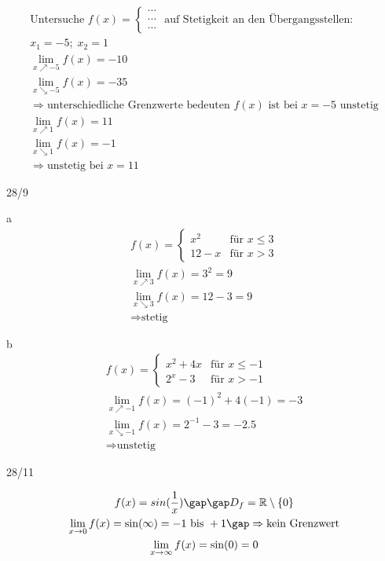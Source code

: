 \begin{gather*}
\text{Untersuche $f(x) = \begin{cases} \cdots \\ \cdots \\ \cdots \end{cases}$ auf Stetigkeit an den Übergangsstellen:} \\
  x_1 = -5;\; x_2 = 1 \\
  \lim\limits_{x \nearrow -5} f(x) = -10 \\
  \lim\limits_{x \searrow -5} f(x) = -35 \\
  \Rightarrow \text{unterschiedliche Grenzwerte bedeuten $f(x)$ ist bei $x = -5$ unstetig} \\
  \lim\limits_{x \nearrow 1} f(x) = 11 \\
  \lim\limits_{x \searrow 1} f(x) = -1 \\
  \Rightarrow \text{unstetig bei $x = 11$}
\end{gather*}
\begin{exercise}{28/9}
  \item [a]
  \begin{gather*}
    f(x) = \begin{cases}
      x^2 & \text{für } x \leq 3 \\
      12 - x & \text{für } x > 3
    \end{cases} \\
    \lim\limits_{x \nearrow 3} f(x) = 3^2 = 9 \\
    \lim\limits_{x \searrow 3} f(x) = 12 - 3 = 9 \\
    \Rightarrow \text{stetig}
  \end{gather*}
  \item [b]
  \begin{gather*}
    f(x) = \begin{cases}
      x^2 + 4x & \text{für } x \leq -1 \\
      2^x - 3 & \text{für } x > -1
    \end{cases} \\
    \lim\limits_{x \nearrow -1} f(x) = (-1)^2 + 4(-1) = -3 \\
    \lim\limits_{x \searrow -1} f(x) = 2^{-1} - 3 = -2.5 \\
    \Rightarrow \text{unstetig}
  \end{gather*}
\end{exercise}
\begin{onepage}
  \begin{exercise}{28/11}
    \item
    \begin{gather*}
      f(x) = sin(\frac{1}{x}) \gap\gap D_f = \mathbb{R} \setminus \{0\} \\
      \lim\limits_{x \to 0} f(x) = \sin(\infty) = -1 \text{ bis } +1 \gap\Rightarrow \text{kein Grenzwert} \\
      \lim\limits_{x \to \infty} f(x) = \sin(0) = 0
    \end{gather*}
  \end{exercise}
\end{onepage}
